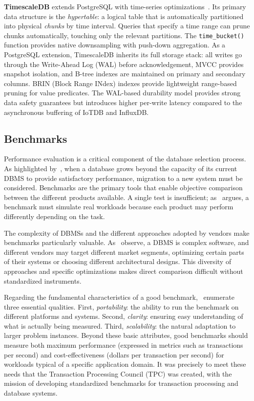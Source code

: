 \textbf{TimescaleDB} extends PostgreSQL with time-series optimizations~\citep{timescaledb}.
Its primary data structure is the \textit{hypertable}: a logical table that is automatically
partitioned into physical \textit{chunks} by time interval. Queries that specify a time range
can prune chunks automatically, touching only the relevant partitions. The \texttt{time\_bucket()}
function provides native downsampling with push-down aggregation. As a PostgreSQL extension,
TimescaleDB inherits its full storage stack: all writes go through the Write-Ahead Log (WAL)
before acknowledgement, MVCC provides snapshot isolation, and B-tree indexes are maintained
on primary and secondary columns. BRIN (Block Range INdex) indexes provide lightweight
range-based pruning for value predicates. The WAL-based durability model provides strong
data safety guarantees but introduces higher per-write latency compared to the asynchronous
buffering of IoTDB and InfluxDB.

\subsection{Benchmarks}

Performance evaluation is a critical component of the database selection process.
As highlighted by~\cite{Ramakrishnan2003}, when a database grows beyond the capacity of its
current DBMS to provide satisfactory performance, migration to a new system must be considered.
Benchmarks are the primary tools that enable objective comparison between the different products
available. A single test is insufficient; as~\cite{Silberschatz2020} argues, a benchmark must
simulate real workloads because each product may perform differently depending on the task.

The complexity of DBMSs and the different approaches adopted by vendors make benchmarks
particularly valuable. As~\cite{Ramakrishnan2003} observe, a DBMS is complex software, and
different vendors may target different market segments, optimizing certain parts of their
systems or choosing different architectural designs. This diversity of approaches and
specific optimizations makes direct comparison difficult without standardized instruments.

Regarding the fundamental characteristics of a good benchmark,~\cite{Ramakrishnan2003} enumerate
three essential qualities. First, \textit{portability}: the ability to run the benchmark on
different platforms and systems. Second, \textit{clarity}: ensuring easy understanding of what
is actually being measured. Third, \textit{scalability}: the natural adaptation to larger
problem instances. Beyond these basic attributes, good benchmarks should measure both maximum
performance (expressed in metrics such as transactions per second) and cost-effectiveness
(dollars per transaction per second) for workloads typical of a specific application domain.
It was precisely to meet these needs that the Transaction Processing Council (TPC) was created,
with the mission of developing standardized benchmarks for transaction processing and database systems.


